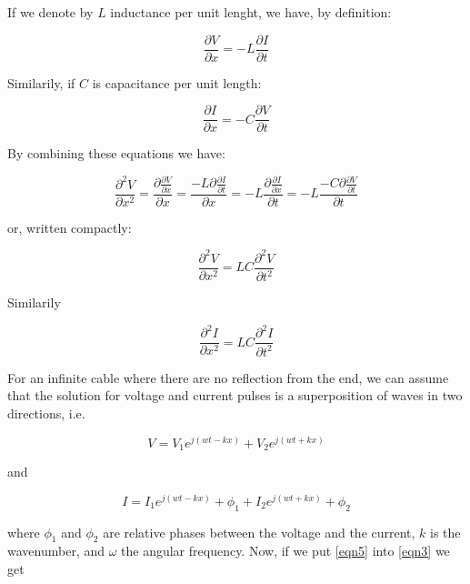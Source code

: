 \documentclass[main.tex]{subfiles}
\begin{document}
If we denote by $L$ inductance per unit lenght, we have, by definition:

\begin{equation}
	\frac{\partial V}{\partial x} = -L \frac{\partial I}{\partial t}
	\label{eqn1}
\end{equation}

Similarily, if $C$ is capacitance per unit length:

\begin{equation}
	\frac{\partial I}{\partial x} = -C \frac{\partial V}{\partial t}
	\label{eqn2}
\end{equation}

By combining these equations we have:

$$ \frac{\partial ^2 V}{\partial x^2} = \frac{\partial \frac{\partial V}{\partial x}}{\partial x} = \frac{-L \partial \frac{\partial I}{\partial t}}{\partial x} = -L \frac{\partial \frac{\partial I}{\partial x}}{\partial t} = -L \frac{-C \partial \frac{\partial V}{\partial t}}{\partial t} $$

or, written compactly:

\begin{equation}
	\frac{\partial ^2V}{\partial x^2} = LC \frac{\partial ^2V}{\partial t^2}
	\label{eqn3}
\end{equation}

Similarily

\begin{equation}
	\frac{\partial ^2I}{\partial x^2} = LC \frac{\partial ^2I}{\partial t^2}
	\label{eqn4}
\end{equation}

For an infinite cable where there are no reflection from the end, we can assume that the solution for voltage and current pulses is a superposition of waves in two directions, i.e. 

\begin{equation}
	V = V_1e^{j(wt-kx)} + V_2e^{j(wt+kx)}
	\label{eqn5}
\end{equation}

and 

\begin{equation}
	I = I_1e^{j(wt-kx)} + \phi_1 + I_2e^{j(wt+kx)} + \phi_2
	\label{eqn6}
\end{equation}

where $\phi_1$ and $\phi_2$ are relative phases between the voltage and the current, $k$ is the wavenumber, and $\omega$ the angular frequency. Now, if we put \ref{eqn5} into \ref{eqn3} we get 
\end{document}
